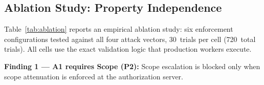 \documentclass[journal]{IEEEtran}
\begin{document}
\subsection{Ablation Study: Property Independence}
\label{sec:ablation}

Table~\ref{tab:ablation} reports an empirical ablation study: six enforcement
configurations tested against all four attack vectors, 30~trials per cell
(720~total trials). All cells use the exact validation logic that production
workers execute.

\begin{table}[h]
\caption{Ablation study: property independence ($N=30$; 720 total trials)}
\label{tab:ablation}
\centering
\footnotesize
\setlength{\tabcolsep}{3pt}
\end{table}

\textbf{Finding 1 — A1 requires Scope (P2):} Scope escalation is blocked only
when scope attenuation is enforced at the authorization server.
\end{document}
